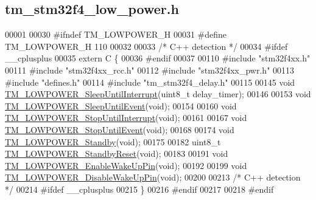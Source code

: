 \hypertarget{tm__stm32f4__low__power_8h_source}{}\subsection{tm\+\_\+stm32f4\+\_\+low\+\_\+power.\+h}

\begin{DoxyCode}
00001 
00030 \textcolor{preprocessor}{#ifndef TM\_LOWPOWER\_H}
00031 \textcolor{preprocessor}{#define TM\_LOWPOWER\_H 110}
00032 
00033 \textcolor{comment}{/* C++ detection */}
00034 \textcolor{preprocessor}{#ifdef \_\_cplusplus}
00035 \textcolor{keyword}{extern} C \{
00036 \textcolor{preprocessor}{#endif}
00037 
00110 \textcolor{preprocessor}{#include "stm32f4xx.h"}
00111 \textcolor{preprocessor}{#include "stm32f4xx\_rcc.h"}
00112 \textcolor{preprocessor}{#include "stm32f4xx\_pwr.h"}
00113 \textcolor{preprocessor}{#include "defines.h"}
00114 \textcolor{preprocessor}{#include "tm\_stm32f4\_delay.h"}
00115 
00145 \textcolor{keywordtype}{void} \hyperlink{group___t_m___l_o_w_p_o_w_e_r___functions_gaabe385d1398fe280b93db08bd615c966}{TM\_LOWPOWER\_SleepUntilInterrupt}(uint8\_t delay\_timer);
00146 
00153 \textcolor{keywordtype}{void} \hyperlink{group___t_m___l_o_w_p_o_w_e_r___functions_gaf92d2da64f91b05c1f3638903d597e74}{TM\_LOWPOWER\_SleepUntilEvent}(\textcolor{keywordtype}{void});
00154 
00160 \textcolor{keywordtype}{void} \hyperlink{group___t_m___l_o_w_p_o_w_e_r___functions_gaacd221196935edc76adb733354d7b095}{TM\_LOWPOWER\_StopUntilInterrupt}(\textcolor{keywordtype}{void});
00161 
00167 \textcolor{keywordtype}{void} \hyperlink{group___t_m___l_o_w_p_o_w_e_r___functions_gac5f4965b4e018c7a0fba6279a639017a}{TM\_LOWPOWER\_StopUntilEvent}(\textcolor{keywordtype}{void});
00168 
00174 \textcolor{keywordtype}{void} \hyperlink{group___t_m___l_o_w_p_o_w_e_r___functions_ga80d88be15aa15b16681fa46cc49d25e2}{TM\_LOWPOWER\_Standby}(\textcolor{keywordtype}{void});
00175 
00182 uint8\_t \hyperlink{group___t_m___l_o_w_p_o_w_e_r___functions_gaef5251d969255825dfd430b7239c93d4}{TM\_LOWPOWER\_StandbyReset}(\textcolor{keywordtype}{void});
00183 
00191 \textcolor{keywordtype}{void} \hyperlink{group___t_m___l_o_w_p_o_w_e_r___functions_gab69784956d57ac303e60ff2766af9671}{TM\_LOWPOWER\_EnableWakeUpPin}(\textcolor{keywordtype}{void});
00192 
00199 \textcolor{keywordtype}{void} \hyperlink{group___t_m___l_o_w_p_o_w_e_r___functions_ga522159a613fd2a682d29b8e8938a8bf9}{TM\_LOWPOWER\_DisableWakeUpPin}(\textcolor{keywordtype}{void});
00200 
00213 \textcolor{comment}{/* C++ detection */}
00214 \textcolor{preprocessor}{#ifdef \_\_cplusplus}
00215 \}
00216 \textcolor{preprocessor}{#endif}
00217 
00218 \textcolor{preprocessor}{#endif}
\end{DoxyCode}
